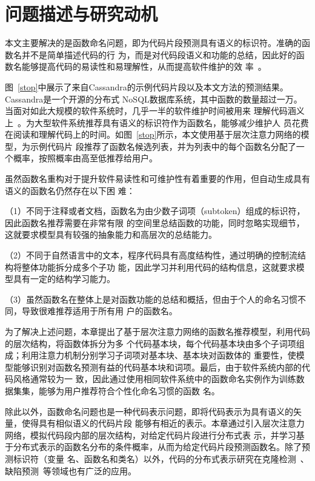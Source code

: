 \section{问题描述与研究动机}\label{motivation3}
本文主要解决的是函数命名问题，即为代码片段预测具有语义的标识符。准确的函数名并不是简单描述代码的行
为，而是对代码段语义和功能的总结，因此好的函数名能够提高代码的易读性和易理解性，从而提高软件维护的效
率~\cite{takang1996effects}。

图~\ref{stop}中展示了来自Cassandra的示例代码片段以及本文方法的预测结果。Cassandra是一个开源的分布式
NoSQL数据库系统，其中函数的数量超过一万。当面对如此大规模的软件系统时，几乎一半的软件维护时间被用来
理解代码涵义上~\cite{corbi1989program}。为大型软件系统推荐具有语义的标识符作为函数名，能够减少维护人
员花费在阅读和理解代码上的时间。如图~\ref{stop}所示，本文使用基于层次注意力网络的模型，为示例代码片
段推荐了函数名候选列表，并为列表中的每个函数名分配了一个概率，按照概率由高至低推荐给用户。

虽然函数名重构对于提升软件易读性和可维护性有着重要的作用，但自动生成具有语义的函数名仍然存在以下困
难：

（1）不同于注释或者文档，函数名为由少数子词项（subtoken）组成的标识符，因此函数名推荐需要在非常有限
的空间里总结函数的功能，同时忽略实现细节，这就要求模型具有较强的抽象能力和高层次的总结能力。

（2）不同于自然语言中的文本，程序代码具有高度结构性，通过明确的控制流结构将整体功能拆分成多个子功
能，因此学习并利用代码的结构信息，这就要求模型具有一定的结构学习能力。

（3）虽然函数名在整体上是对函数功能的总结和概括，但由于个人的命名习惯不同，导致很难推荐适用于所有用
户的函数名。

为了解决上述问题，本章提出了基于层次注意力网络的函数名推荐模型，利用代码的层次结构，将函数体拆分为多
个代码基本块，每个代码基本块由多个子词项组成；利用注意力机制分别学习子词项对基本块、基本块对函数体的
重要性，使模型能够识别对函数名预测有益的代码基本块和词项。最后，由于软件系统内部的代码风格通常较为一
致，因此通过使用相同软件系统中的函数命名实例作为训练数据集集，能够为用户推荐符合个性化命名习惯的函数
名。

除此以外，函数命名问题也是一种代码表示问题，即将代码表示为具有语义的矢量，使得具有相似语义的代码片段
能够有相近的表示。本章通过引入层次注意力网络，模拟代码段内部的层次结构，对给定代码片段进行分布式表
示，并学习基于分布式表示的函数名分布的条件概率，从而为给定代码片段预测函数名。除了预测标识符（变量
名、函数名和类名）以外，代码的分布式表示研究在克隆检测~\cite{white2016deep,allamanis2018learning}、
缺陷预测~\cite{murali2017finding}等领域也有广泛的应用。

